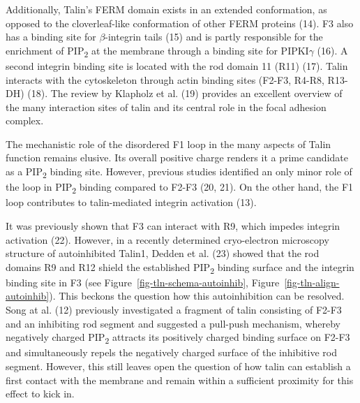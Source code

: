 \documentclass[
  letterpaper,
  DIV=11,
  numbers=noendperiod]{scrartcl}
\begin{document}
Additionally, Talin's FERM domain exists in an extended conformation, as
opposed to the cloverleaf-like conformation of other FERM proteins (14).
F3 also has a binding site for \(\beta\)-integrin tails (15) and is
partly responsible for the enrichment of PIP\textsubscript{2} at the
membrane through a binding site for PIPKI\(\gamma\) (16). A second
integrin binding site is located with the rod domain 11 (R11) (17).
Talin interacts with the cytoskeleton through actin binding sites
(F2-F3, R4-R8, R13-DH) (18). The review by Klapholz et al. (19) provides
an excellent overview of the many interaction sites of talin and its
central role in the focal adhesion complex.

The mechanistic role of the disordered F1 loop in the many aspects of
Talin function remains elusive. Its overall positive charge renders it a
prime candidate as a PIP\textsubscript{2} binding site. However,
previous studies identified an only minor role of the loop in
PIP\textsubscript{2} binding compared to F2-F3 (20, 21). On the other
hand, the F1 loop contributes to talin-mediated integrin activation
(13).

It was previously shown that F3 can interact with R9, which impedes
integrin activation (22). However, in a recently determined
cryo-electron microscopy structure of autoinhibited Talin1, Dedden et
al. (23) showed that the rod domains R9 and R12 shield the established
PIP\textsubscript{2} binding surface and the integrin binding site in F3
(see
Figure~\ref{fig-tln-schema-autoinhib}, Figure~\ref{fig-tln-align-autoinhib}).
This beckons the question how this autoinhibition can be resolved. Song
at al. (12) previously investigated a fragment of talin consisting of
F2-F3 and an inhibiting rod segment and suggested a pull-push mechanism,
whereby negatively charged PIP\textsubscript{2} attracts its positively
charged binding surface on F2-F3 and simultaneously repels the
negatively charged surface of the inhibitive rod segment. However, this
still leaves open the question of how talin can establish a first
contact with the membrane and remain within a sufficient proximity for
this effect to kick in.
\end{document}
